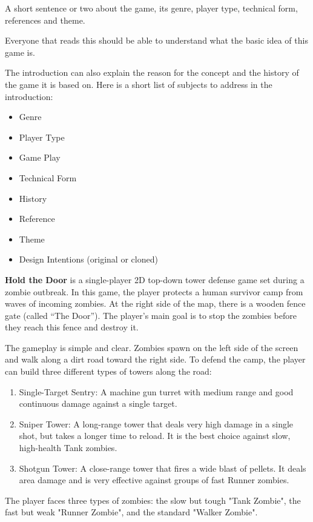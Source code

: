 \begin{guidance}
A short sentence or two about the game, its genre, player type, technical form, references and theme.

Everyone that reads this should be able to understand what the basic idea of this game is.

The introduction can also explain the reason for the concept and the history of the game it is based on. Here is a short list of subjects to address in the introduction:

\begin{itemize}[label=\textendash]
  \item Genre
  \item Player Type
  \item Game Play
  \item Technical Form
  \item History
  \item Reference
  \item Theme
  \item Design Intentions (original or cloned)
\end{itemize}
\end{guidance}
\textbf{Hold the Door} is a single-player 2D top-down tower defense game set during a zombie outbreak. In this game, the player protects a human survivor camp from waves of incoming zombies. At the right side of the map, there is a wooden fence gate (called ``The Door''). The player's main goal is to stop the zombies before they reach this fence and destroy it.

The gameplay is simple and clear. Zombies spawn on the left side of the screen and walk along a dirt road toward the right side. To defend the camp, the player can build three different types of towers along the road:
\begin{enumerate}
  \item {Single-Target Sentry:} A machine gun turret with medium range and good continuous damage against a single target.
  \item {Sniper Tower:} A long-range tower that deals very high damage in a single shot, but takes a longer time to reload. It is the best choice against slow, high-health Tank zombies.
  \item {Shotgun Tower:} A close-range tower that fires a wide blast of pellets. It deals area damage and is very effective against groups of fast Runner zombies.
\end{enumerate}

The player faces three types of zombies: the slow but tough "Tank Zombie", the fast but weak "Runner Zombie", and the standard "Walker Zombie". 

